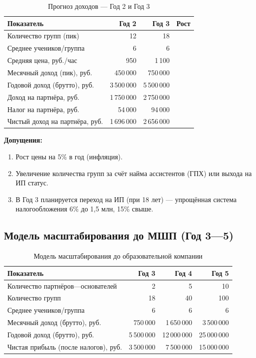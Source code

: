 \documentclass[12pt,a4paper]{article}
\begin{document}
\begin{table}[H]
\centering
\caption{Прогноз доходов --- Год 2 и Год 3}
\label{tab:year23_forecast}
\begin{tabular}{lrrr}
\toprule
Показатель & Год 2 & Год 3 & Рост \\
\midrule
Количество групп (пик) & 12 & 18 \\
Среднее учеников/группа & 6 & 6 \\
Средняя цена, руб./час & 950 & 1\,100 \\
Месячный доход (пик), руб. & 450\,000 & 750\,000 \\
Годовой доход (брутто), руб. & 3\,500\,000 & 5\,500\,000 \\
Доход на партнёра, руб. & 1\,750\,000 & 2\,750\,000 \\
Налог на партнёра, руб. & 54\,000 & 94\,000 \\
Чистый доход на партнёра, руб. & 1\,696\,000 & 2\,656\,000 \\
\bottomrule
\end{tabular}
\end{table}

\textbf{Допущения:}
\begin{enumerate}
  \item Рост цены на 5\% в год (инфляция).
  \item Увеличение количества групп за счёт найма ассистентов (ГПХ) или выхода на ИП статус.
  \item В Год 3 планируется переход на ИП (при 18 лет) --- упрощённая система налогообложения 6\% до 1,5 млн, 15\% свыше.
\end{enumerate}

\subsection{Модель масштабирования до МШП (Год 3---5)}

\begin{table}[H]
\centering
\caption{Модель масштабирования до образовательной компании}
\label{tab:scaling_model}
\begin{tabular}{lrrr}
\toprule
Показатель & Год 3 & Год 4 & Год 5 \\
\midrule
Количество партнёров---основателей & 2 & 5 & 10 \\
Количество групп & 18 & 40 & 100 \\
Среднее учеников/группа & 6 & 6 & 6 \\
Месячный доход (брутто), руб. & 750\,000 & 1\,650\,000 & 3\,500\,000 \\
Годовой доход (брутто), руб. & 5\,500\,000 & 12\,000\,000 & 25\,000\,000 \\
Чистая прибыль (после налогов), руб. & 3\,500\,000 & 7\,500\,000 & 15\,000\,000 \\
\bottomrule
\end{tabular}
\end{table}
\end{document}
